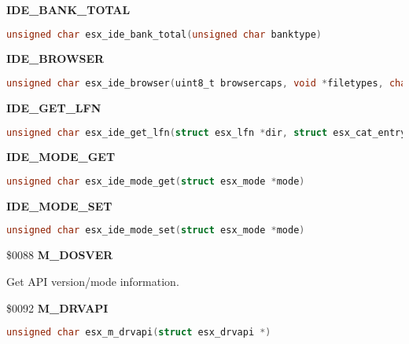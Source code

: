 \textbf{IDE\_BANK\_TOTAL}

\begin{lstlisting}[language=C]
unsigned char esx_ide_bank_total(unsigned char banktype)
\end{lstlisting}

\textbf{IDE\_BROWSER}

\begin{lstlisting}[language=C]
unsigned char esx_ide_browser(uint8_t browsercaps, void *filetypes, char *help,char *dst_sfn, char *dst_lfn)
\end{lstlisting}

\textbf{IDE\_GET\_LFN}

\begin{lstlisting}[language=C]
unsigned char esx_ide_get_lfn(struct esx_lfn *dir, struct esx_cat_entry *query)
\end{lstlisting}

\textbf{IDE\_MODE\_GET}

\begin{lstlisting}[language=C]
unsigned char esx_ide_mode_get(struct esx_mode *mode)
\end{lstlisting}

\textbf{IDE\_MODE\_SET}

\begin{lstlisting}[language=C]
unsigned char esx_ide_mode_set(struct esx_mode *mode)
\end{lstlisting}

\$0088 \textbf{M\_DOSVER}

Get API version/mode information.

%

\$0092 \textbf{M\_DRVAPI}

\begin{lstlisting}[language=C]
unsigned char esx_m_drvapi(struct esx_drvapi *)
\end{lstlisting}

